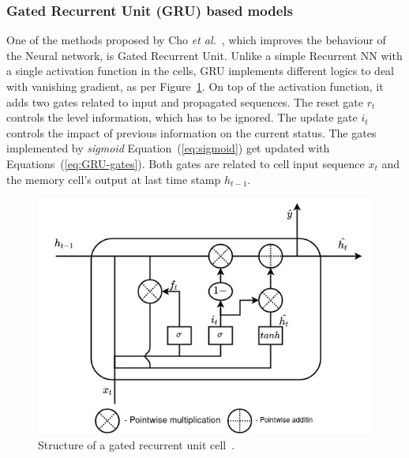 %
\subsubsection{Gated Recurrent Unit (GRU) based models} \label{subsub:gru}
One of the methods proposed by Cho \textit{et al.}~\cite{GRU_cho_properties_2014}, which improves the behaviour of the Neural network, is Gated Recurrent Unit.
Unlike a simple Recurrent NN with a single activation function in the cells, GRU implements different logics to deal with vanishing gradient, as per \mbox{Figure~\ref{fig:GRU-cell}}.
On top of the activation function, it adds two gates related to input and propagated sequences.
The reset gate $r_t$ controls the level information, which has to be ignored.
The update gate $i_t$ controls the impact of previous information on the current status.
The gates implemented by \textit{sigmoid} \mbox{Equation~(\ref{eq:sigmoid})} get updated with \mbox{Equations~(\ref{eq:GRU-gates})}.
Both gates are related to cell input sequence $x_t$ and the memory cell's output at last time stamp $h_{t-1}$.
\begin{figure}[ht]%
    \centering
    \includegraphics[width=\linewidth]{II_Body/GRU/images/GRU.jpg}
    \caption{Structure of a gated recurrent unit cell~\cite{li_approach_2019}.}
    \label{fig:GRU-cell}
\end{figure}
